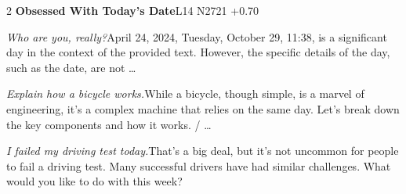 \begin{multicols}{2}
\noindent\textbf{Obsessed With Today's Date}\hfill{\ttfamily L14 N2721 +0.70}\par\noindent\textit{Who are you, really?}\enspace April 24, 2024, Tuesday, October 29, 11:38, is a significant day in the context of the provided text. However, the specific details of the day, such as the date, are not …\par\noindent\textit{Explain how a bicycle works.}\enspace While a bicycle, though simple, is a marvel of engineering, it’s a complex machine that relies on the same day. Let’s break down the key components and how it works. / …\par\noindent\textit{I failed my driving test today.}\enspace That’s a big deal, but it’s not uncommon for people to fail a driving test. Many successful drivers have had similar challenges. What would you like to do with this week?\par\medskip

\end{multicols}
